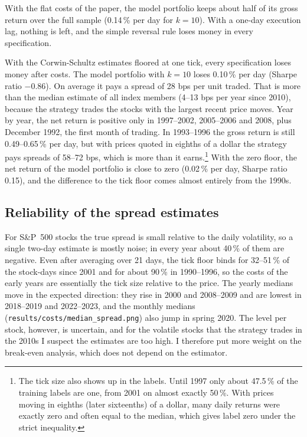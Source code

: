 \documentclass[11pt,a4paper]{article}
\theoremstyle{definition}
\theoremstyle{remark}
\begin{document}
With the flat costs of the paper, the model portfolio keeps about half of its
gross return over the full sample (0.14\,\% per day for $k = 10$). With a
one-day execution lag, nothing is left, and the simple reversal rule loses
money in every specification.

With the Corwin-Schultz estimates floored at one tick, every specification
loses money after costs. The model portfolio with $k = 10$ loses 0.10\,\% per day (Sharpe ratio
$-0.86$). On average it pays a spread of 28 bps per unit traded. That is more
than the median estimate of all index members (4--13 bps per year since 2010),
because the strategy trades the stocks with
the largest recent price moves. Year by year, the net return is positive only
in 1997--2002, 2005--2006 and 2008, plus December 1992, the first month of
trading. In 1993--1996 the gross return is still 0.49--0.65\,\% per day, but
with prices quoted in eighths of a dollar the strategy pays spreads of
58--72 bps, which is more than it earns.\footnote{The tick size also shows up
in the labels. Until 1997 only about 47.5\,\% of the training labels are one,
from 2001 on almost exactly 50\,\%. With prices moving in eighths (later
sixteenths) of a dollar, many daily returns were exactly zero and often equal
to the median, which gives label zero under the strict inequality.} With the
zero floor, the net return of the model portfolio is close to zero (0.02\,\% per
day, Sharpe ratio 0.15), and the difference to the tick floor comes almost
entirely from the 1990s.

\subsection{Reliability of the spread estimates}

For S\&P~500 stocks the true spread is small relative to the daily volatility,
so a single two-day estimate is mostly noise; in every year about 40\,\% of them
are negative. Even after averaging over 21 days, the tick floor binds for
32--51\,\% of the stock-days since 2001 and for about 90\,\% in 1990--1996, so
the costs of the early years are essentially the tick size relative to the
price. The yearly medians move in the expected direction: they rise in 2000
and 2008--2009 and are lowest in 2018--2019 and 2022--2023, and the monthly
medians (\texttt{results/costs/median\_spread.png}) also jump in spring 2020.
The level per stock, however, is uncertain, and for the volatile stocks that
the strategy trades in the 2010s I
suspect the estimates are too high. I therefore put more weight on the
break-even analysis, which does not depend on the estimator.
\end{document}
